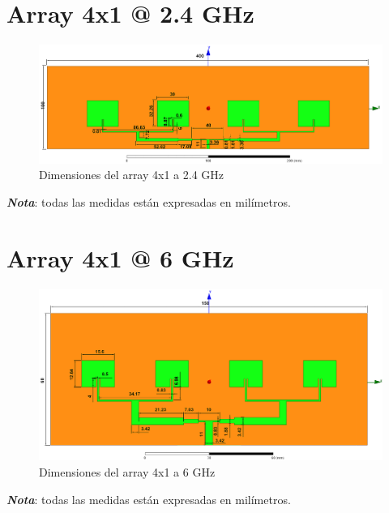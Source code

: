 \section{Array 4x1 @ 2.4 GHz}
\vfill
\begin{figure}[H]
   	 \centering
        \includegraphics[width=18cm ,height=\textheight, keepaspectratio=true, angle=90,origin=c]{archivos/desarrollo/autocad/5}
        \caption{Dimensiones del array 4x1 a 2.4 GHz}
        \label{fig:4x11}
\end{figure}
\vfill
\textit{\textbf{Nota}}: todas las medidas están expresadas en milímetros.
\newpage

\section{Array 4x1 @ 6 GHz}
\vfill
\begin{figure}[H]
   	 \centering
        \includegraphics[width=18cm ,height=\textwidth, keepaspectratio=true, angle=90,origin=c]{archivos/desarrollo/autocad/6}
        \caption{Dimensiones del array 4x1 a 6 GHz}
        \label{fig:4x12}
\end{figure}
\vfill
\textit{\textbf{Nota}}: todas las medidas están expresadas en milímetros.
\newpage

